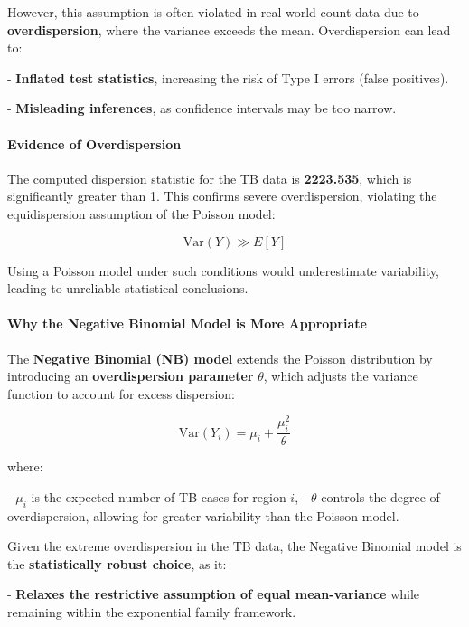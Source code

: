 \documentclass[
  11pt,
  a4paper,11pt]{article}
\begin{document}
However, this assumption is often violated in real-world count data due
to \textbf{overdispersion}, where the variance exceeds the mean.
Overdispersion can lead to:

- \textbf{Inflated test statistics}, increasing the risk of Type I
errors (false positives).

\hfill\break
- \textbf{Misleading inferences}, as confidence intervals may be too
narrow.

\paragraph{\texorpdfstring{\textbf{Evidence of
Overdispersion}}{Evidence of Overdispersion}}\label{evidence-of-overdispersion}

The computed dispersion statistic for the TB data is \textbf{2223.535},
which is significantly greater than 1. This confirms severe
overdispersion, violating the equidispersion assumption of the Poisson
model:

\[
\text{Var}(Y) \gg E[Y]
\]

Using a Poisson model under such conditions would underestimate
variability, leading to unreliable statistical conclusions.

\paragraph{\texorpdfstring{\textbf{Why the Negative Binomial Model is
More
Appropriate}}{Why the Negative Binomial Model is More Appropriate}}\label{why-the-negative-binomial-model-is-more-appropriate}

The \textbf{Negative Binomial (NB) model} extends the Poisson
distribution by introducing an \textbf{overdispersion parameter}
\(\theta\), which adjusts the variance function to account for excess
dispersion:

\[
\text{Var}(Y_i) = \mu_i + \frac{\mu_i^2}{\theta}
\]

where:

- \(\mu_i\) is the expected number of TB cases for region \(i\), -
\(\theta\) controls the degree of overdispersion, allowing for greater
variability than the Poisson model.

Given the extreme overdispersion in the TB data, the Negative Binomial
model is the \textbf{statistically robust choice}, as it:

- \textbf{Relaxes the restrictive assumption of equal mean-variance}
while remaining within the exponential family framework.
\end{document}
